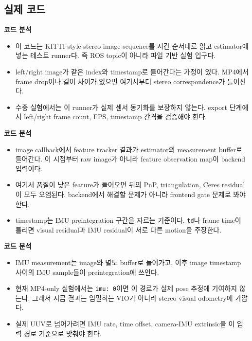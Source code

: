 \documentclass[11pt,a4paper]{article}
\newcommand{\code}[1]{\texttt{#1}}
\newcommand{\codeheading}[1]{\par\vspace{6pt}\noindent{\footnotesize\bfseries\textcolor{codeemph}{#1}}\par\vspace{2pt}}
\newenvironment{codeanalysis}{%
  \par\vspace{2pt}\noindent
  {\footnotesize\bfseries\textcolor{accentblue}{코드 분석}}\par
  \begin{itemize}[leftmargin=1.35em,topsep=2pt,itemsep=1pt,parsep=0pt]
  \footnotesize
}{%
  \end{itemize}
  \vspace{6pt}
}
\begin{document}
\subsection*{실제 코드}

\codeheading{KITTIOdomTest.cpp:88--113}

\begin{codeanalysis}
  \item 이 코드는 KITTI-style stereo image sequence를 시간 순서대로 읽고 estimator에 넣는 테스트 runner다. 즉 ROS topic이 아니라 파일 기반 실험 입구다.
  \item left/right image가 같은 index와 timestamp로 들어간다는 가정이 있다. MP4에서 frame drop이나 길이 차이가 있으면 여기서부터 stereo correspondence가 틀어진다.
  \item 수중 실험에서는 이 runner가 실제 센서 동기화를 보장하지 않는다. export 단계에서 left/right frame count, FPS, timestamp 간격을 검증해야 한다.
\end{codeanalysis}

\codeheading{estimator.cpp:160--194}

\begin{codeanalysis}
  \item image callback에서 feature tracker 결과가 estimator의 measurement buffer로 들어간다. 이 시점부터 raw image가 아니라 feature observation map이 backend 입력이다.
  \item 여기서 품질이 낮은 feature가 들어오면 뒤의 PnP, triangulation, Ceres residual이 모두 오염된다. backend에서 해결할 문제가 아니라 frontend gate 문제로 봐야 한다.
  \item timestamp는 IMU preintegration 구간을 자르는 기준이다. \code{td}나 frame time이 틀리면 visual residual과 IMU residual이 서로 다른 motion을 주장한다.
\end{codeanalysis}

\codeheading{estimator.cpp:199--205}

\begin{codeanalysis}
  \item IMU measurement는 image와 별도 buffer로 들어가고, 이후 image timestamp 사이의 IMU sample들이 preintegration에 쓰인다.
  \item 현재 MP4-only 실험에서는 \code{imu: 0}이면 이 경로가 실제 pose 추정에 기여하지 않는다. 그래서 지금 결과는 엄밀히는 VIO가 아니라 stereo visual odometry에 가깝다.
  \item 실제 UUV로 넘어가려면 IMU rate, time offset, camera-IMU extrinsic을 이 입력 경로 기준으로 맞춰야 한다.
\end{codeanalysis}
\end{document}
